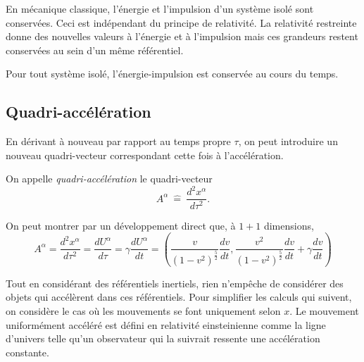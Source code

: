 \documentclass[a4paper,11pt]{report}
\begin{document}
            En mécanique classique, l'énergie et l'impulsion d'un système isolé sont conservées. Ceci est indépendant du principe de relativité. La relativité restreinte donne des nouvelles valeurs à l'énergie et à l'impulsion mais ces grandeurs restent conservées au sein d'un même référentiel.\\
            
            \begin{prin}
            \begin{leftbar}
                Pour tout système isolé, l'énergie-impulsion est conservée au cours du temps.
            \end{leftbar}
            \end{prin}
            
        \subsection{Quadri-accélération}
        
            En dérivant à nouveau par rapport au temps propre $\tau$, on peut introduire un nouveau quadri-vecteur correspondant cette fois à l'accélération.
            \begin{definition}
                On appelle \textit{quadri-accélération} le quadri-vecteur
                \begin{equation}
                    A^\alpha ~\hat{=}~ \frac{d^2x^\alpha}{d\tau^2}.
                \end{equation}
            \end{definition}
            On peut montrer par un développement direct que, à $1+1$ dimensions,
            \begin{equation}
                A^\alpha = \frac{d^2x^\alpha}{d\tau^2} = \frac{dU^\alpha}{d\tau} = \gamma\frac{dU^\alpha}{dt} = \left( \frac{v}{(1-v^2)^{\frac{5}{2}}}\frac{dv}{dt}, \frac{v^2}{(1-v^2)^{\frac{5}{2}}}\frac{dv}{dt} +\gamma \frac{dv}{dt}\right)
            \end{equation}
        
            Tout en considérant des référentiels inertiels, rien n'empêche de considérer des objets qui accélèrent dans ces référentiels. Pour simplifier les calculs qui suivent, on considère le cas où les mouvements se font uniquement selon $x$. Le mouvement uniformément accéléré est défini en relativité einsteinienne comme la ligne d'univers telle qu'un observateur qui la suivrait ressente une accélération constante.
            
\end{document}
